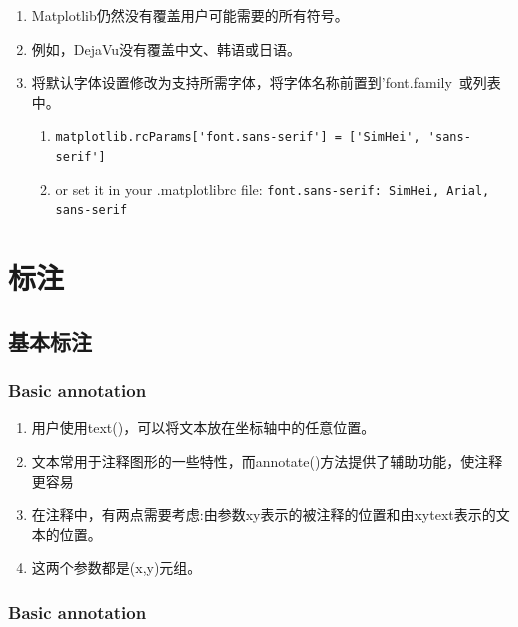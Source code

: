 \documentclass[UTF8,a4paper,12pt]{ctexart}  %
\providecommand{\tightlist}{\setlength{\itemsep}{0pt}\setlength{\parskip}{0pt}}
\newcommand{\passthrough}[1]{\lstset{mathescape=false}#1\lstset{mathescape=true}}
\begin{document}
\begin{enumerate}
\def\labelenumi{\arabic{enumi}.}
\tightlist
\item
  Matplotlib仍然没有覆盖用户可能需要的所有符号。
\item
  例如，DejaVu没有覆盖中文、韩语或日语。
\item
  将默认字体设置修改为支持所需字体，将字体名称前置到'font.family~或列表中。

  \begin{enumerate}
  \def\labelenumii{\arabic{enumii}.}
  \tightlist
  \item
    \passthrough{\lstinline!matplotlib.rcParams['font.sans-serif'] = ['SimHei', 'sans-serif']!}
  \item
    or set it in your .matplotlibrc file:
    \passthrough{\lstinline!font.sans-serif: SimHei, Arial, sans-serif!}
  \end{enumerate}
\end{enumerate}

\hypertarget{ux6807ux6ce8}{%
\section{标注}\label{ux6807ux6ce8}}

\hypertarget{ux57faux672cux6807ux6ce8}{%
\subsection{基本标注}\label{ux57faux672cux6807ux6ce8}}

\hypertarget{basic-annotation}{%
\subsubsection{Basic annotation}\label{basic-annotation}}

\begin{enumerate}
\def\labelenumi{\arabic{enumi}.}
\tightlist
\item
  用户使用text()，可以将文本放在坐标轴中的任意位置。
\item
  文本常用于注释图形的一些特性，而annotate()方法提供了辅助功能，使注释更容易
\item
  在注释中，有两点需要考虑:由参数xy表示的被注释的位置和由xytext表示的文本的位置。
\item
  这两个参数都是(x,y)元组。
\end{enumerate}

\hypertarget{basic-annotation-1}{%
\subsubsection{Basic annotation}\label{basic-annotation-1}}
\end{document}
